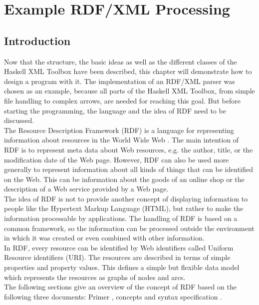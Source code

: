 \documentclass[11pt,a4paper,headsepline, bibtotoc]{scrreprt}
\begin{document}
\chapter{Example RDF/XML Processing}
\section{Introduction}
Now that the structure, the basic ideas as well as the different classes of the Haskell XML Toolbox have been described, this chapter will demonstrate how to design a program with it. The implementation of an RDF/XML parser was chosen as an example, because all parts of the Haskell XML Toolbox, from simple file handling to complex arrows, are needed for reaching this goal. But before starting the programming, the language and the idea of RDF need to be discussed.\\
The Resource Description Framework (RDF) is a language for representing information about resources in the World Wide Web \cite{RDF:Primer}. The main intention of RDF is to represent meta data about Web resources, e.g. the author, title, or the modification date of the Web page. However, RDF can also be used more generally to represent information about all kinds of things that can be identified on the Web. This can be information about the goods of an online shop or the description of a Web service provided by a Web page. \\
The idea of RDF is not to provide another concept of displaying information to people like the Hypertext Markup Language (HTML), but rather to make the information processable by applications. The handling of RDF is based on a common framework, so the information can be processed outside the environment in which it was created or even combined with other information.\\
In RDF, every resource can be identified by Web identifiers called Uniform Resource identifiers (URI). The resources are described in terms of simple properties and property values. This defines a simple but flexible data model which represents the resources as graphs of nodes and arcs.\\  
The following sections give an overview of the  concept of RDF based on the following three documents: Primer \cite{RDF:Primer}, concepts \cite{RDF:Concepts} and syntax specification \cite{RDF:Syntax}.
\end{document}
